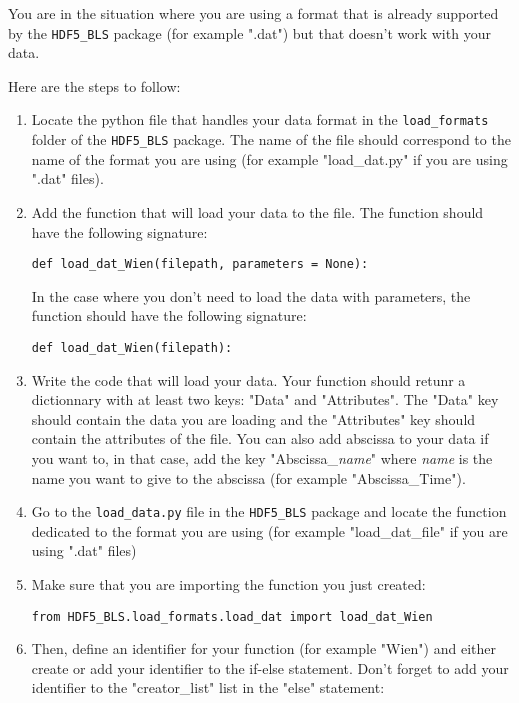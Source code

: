 \begin{tcolorbox}
    You are in the situation where you are using a format that is already supported by the \texttt{HDF5\_BLS} package (for example ".dat") but that doesn't work with your data.
\end{tcolorbox}

Here are the steps to follow:
\begin{enumerate}
    \item Locate the python file that handles your data format in the \texttt{load\_formats} folder of the \texttt{HDF5\_BLS} package. The name of the file should correspond to the name of the format you are using (for example "load\_dat.py" if you are using ".dat" files).
    \item Add the function that will load your data to the file. The function should have the following signature:
\begin{lstlisting}
def load_dat_Wien(filepath, parameters = None):
\end{lstlisting}
    In the case where you don't need to load the data with parameters, the function should have the following signature:
\begin{lstlisting}
def load_dat_Wien(filepath):
\end{lstlisting}
    \item Write the code that will load your data. Your function should retunr a dictionnary with at least two keys: "Data" and "Attributes". The "Data" key should contain the data you are loading and the "Attributes" key should contain the attributes of the file. You can also add abscissa to your data if you want to, in that case, add the key "Abscissa\_\textsl{name}" where \textsl{name} is the name you want to give to the abscissa (for example "Abscissa\_Time").
    \item Go to the \texttt{load\_data.py} file in the \texttt{HDF5\_BLS} package and locate the function dedicated to the format you are using (for example "load\_dat\_file" if you are using ".dat" files)
    \item Make sure that you are importing the function you just created:
\begin{lstlisting}
from HDF5_BLS.load_formats.load_dat import load_dat_Wien
\end{lstlisting}
    \item Then, define an identifier for your function (for example "Wien") and either create or add your identifier to the if-else statement. Don't forget to add your identifier to the "creator\_list" list in the "else" statement:

\end{enumerate}
